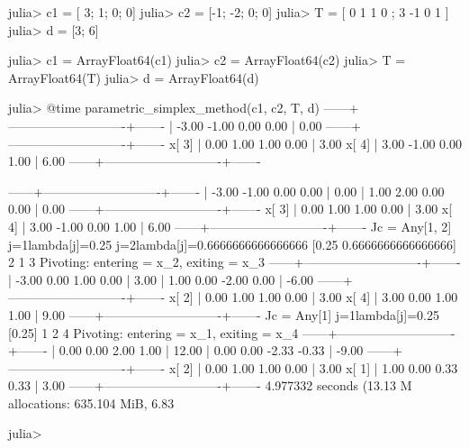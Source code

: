 julia> c1 = [ 3;  1; 0; 0]
julia> c2 = [-1; -2; 0; 0]
julia> T  = [ 0  1  1  0 ;  3 -1  0  1 ]
julia> d = [3; 6]


julia> c1 = Array{Float64}(c1)
julia> c2 = Array{Float64}(c2)
julia> T  = Array{Float64}(T)
julia> d  = Array{Float64}(d)

julia> @time  parametric_simplex_method(c1, c2, T, d)
------+----------------------------+-------
      | -3.00  -1.00   0.00   0.00 |   0.00
------+----------------------------+-------
x[ 3] |  0.00   1.00   1.00   0.00 |   3.00
x[ 4] |  3.00  -1.00   0.00   1.00 |   6.00
------+----------------------------+-------
 
------+----------------------------+-------
      | -3.00  -1.00   0.00   0.00 |   0.00
      |  1.00   2.00   0.00   0.00 |   0.00
------+----------------------------+-------
x[ 3] |  0.00   1.00   1.00   0.00 |   3.00
x[ 4] |  3.00  -1.00   0.00   1.00 |   6.00
------+----------------------------+-------
Jc = Any[1, 2]
j=1lambda[j]=0.25
j=2lambda[j]=0.6666666666666666
[0.25 0.6666666666666666]
2
1 3
Pivoting: entering = x_2, exiting = x_3
------+----------------------------+-------
      | -3.00   0.00   1.00   0.00 |   3.00
      |  1.00   0.00  -2.00   0.00 |  -6.00
------+----------------------------+-------
x[ 2] |  0.00   1.00   1.00   0.00 |   3.00
x[ 4] |  3.00   0.00   1.00   1.00 |   9.00
------+----------------------------+-------
Jc = Any[1]
j=1lambda[j]=0.25
[0.25]
1
2 4
Pivoting: entering = x_1, exiting = x_4
------+----------------------------+-------
      |  0.00   0.00   2.00   1.00 |  12.00
      |  0.00   0.00  -2.33  -0.33 |  -9.00
------+----------------------------+-------
x[ 2] |  0.00   1.00   1.00   0.00 |   3.00
x[ 1] |  1.00   0.00   0.33   0.33 |   3.00
------+----------------------------+-------
  4.977332 seconds (13.13 M allocations: 635.104 MiB, 6.83%

julia> 